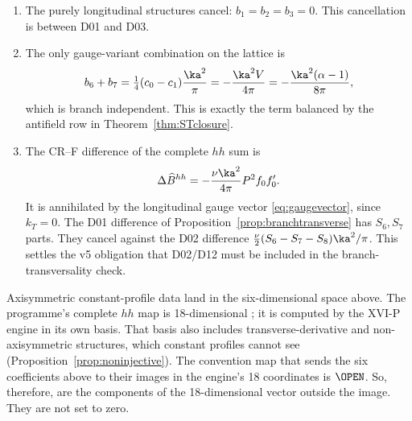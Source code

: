 \begin{corollary}
\label{cor:hhcontent}
\leavevmode
\begin{enumerate}[label=\textup{(\roman*)}]
\item The purely longitudinal structures cancel:
\(b_1=b_2=b_3=0\).
This cancellation is between D01 and D03.
\item The only gauge-variant combination on the lattice is
\[
b_6+b_7=\tfrac14(c_0-c_1)\frac{\ka^2}{\pi}
=-\frac{\ka^2V}{4\pi}
=-\frac{\ka^2(\alpha-1)}{8\pi},
\]
which is branch independent.
This is exactly the term balanced by the antifield row in
Theorem~\ref{thm:STclosure}.
\item The CR--F difference of the complete \(hh\) sum is
\[
\Delta\widehat B^{hh}=-\frac{\nu\ka^2}{4\pi}P^2f_0f_0'.
\]
It is annihilated by the longitudinal gauge vector
\eqref{eq:gaugevector}, since \(k_T=0\).
The D01 difference of Proposition~\ref{prop:branchtransverse} has
\(S_6,S_7\) parts. They cancel against the D02 difference
\(\tfrac{\nu}{2}(S_6-S_7-S_8)\ka^2/\pi\).
This settles the v5 obligation that D02/D12 must be included in
the branch-transversality check.
\end{enumerate}
\end{corollary}

\begin{remark}
Axisymmetric constant-profile data land in the six-dimensional
space above.
The programme's complete \(hh\) map is 18-dimensional
\cite{CheungConeV4,CheungConeV5}; it is computed by the
XVI-P engine in its own basis.
That basis also includes transverse-derivative and non-axisymmetric
structures, which constant profiles cannot see
(Proposition~\ref{prop:noninjective}).
The convention map that sends the six coefficients above to their
images in the engine's 18 coordinates is \(\OPEN\).
So, therefore, are the components of the 18-dimensional vector
outside the image.
They are not set to zero.
\end{remark}
